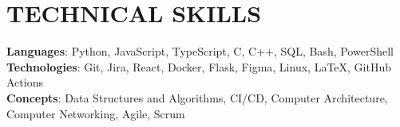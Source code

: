 \section{\textbf {\large TECHNICAL SKILLS}}
    \begin{itemize}[leftmargin=0.15in, label={}]
	\small{\item{
		\textbf{Languages}{: Python, JavaScript, TypeScript, C, C++, SQL, Bash, PowerShell} \\
		\textbf{Technologies}{: Git, Jira, React, Docker, Flask, Figma, Linux, LaTeX, GitHub Actions} \\
		\textbf{Concepts}{: Data Structures and Algorithms, CI/CD, Computer Architecture, Computer Networking, Agile, Scrum}
	}}
    \end{itemize}